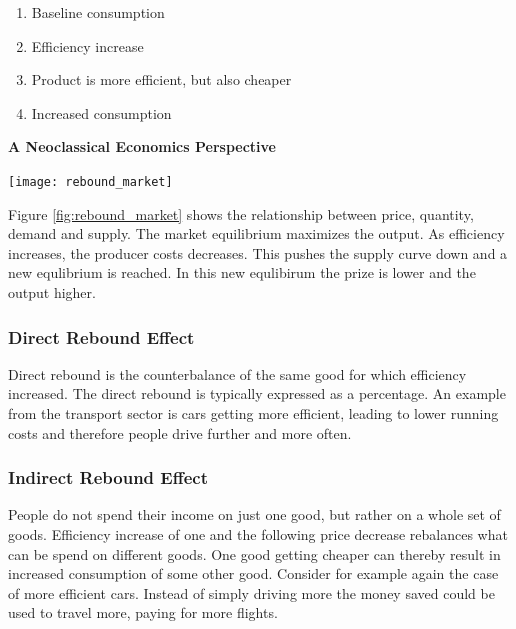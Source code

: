 \begin{enumerate}
    \item Baseline consumption
    \item Efficiency increase
    \item Product is more efficient, but also cheaper
    \item Increased consumption
\end{enumerate}

\begin{tcolorbox}
    \textbf{A Neoclassical Economics Perspective}\\

        \begin{center}
        \texttt{[image: rebound\_market]}
        \
        \label{fig:rebound_market}
        \end{center}

    Figure \ref{fig:rebound_market} shows the relationship between price, quantity, demand and supply.
    The market equilibrium maximizes the output.
    As efficiency increases, the producer costs decreases.
    This pushes the supply curve down and a new equlibrium is reached.
    In this new equlibirum the prize is lower and the output higher.
\end{tcolorbox}

\subsubsection{Direct Rebound Effect}
Direct rebound is the counterbalance of the same good for which efficiency increased.
The direct rebound is typically expressed as a percentage.
An example from the transport sector is cars getting more efficient, leading to lower running costs and therefore people drive further and more often.

\subsubsection{Indirect Rebound Effect}
People do not spend their income on just one good, but rather on a whole set of goods.
Efficiency increase of one and the following price decrease rebalances what can be spend on different goods.
One good getting cheaper can thereby result in increased consumption of some other good.
Consider for example again the case of more efficient cars.
Instead of simply driving more the money saved could be used to travel more, paying for more flights.

